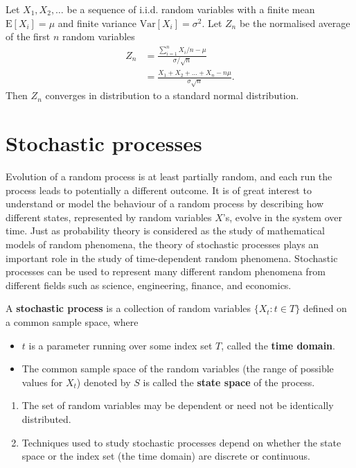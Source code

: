 \documentclass[
]{book}
\theoremstyle{definition}
\theoremstyle{definition}
\theoremstyle{definition}
\theoremstyle{definition}
\theoremstyle{remark}
\begin{document}
Let \(X_1, X_2, \ldots\) be a sequence of i.i.d. random variables with a
finite mean \(\mathrm{E}[X_i] = \mu\) and finite variance
\(\mathrm{Var}[X_i] = \sigma^2\). Let \(Z_n\) be the normalised average of
the first \(n\) random variables \[\begin{aligned}
        Z_n &= \frac{\sum_{i=1}^n X_i/n  - \mu}{\sigma/\sqrt{n}} \\
               &= \frac{X_1 + X_2 + \ldots + X_n  - n\mu}{\sigma \sqrt{n}}.
    \end{aligned}\] Then \(Z_n\) converges in distribution to a standard
normal distribution.

\hypertarget{stochastic-processes}{%
\chapter{Stochastic processes}\label{stochastic-processes}}

Evolution of a random process is at least partially random, and each run
the process leads to potentially a different outcome. It is of great
interest to understand or model the behaviour of a random process by
describing how different states, represented by random variables \(X\)'s,
evolve in the system over time. Just as probability theory is considered
as the study of mathematical models of random phenomena, the theory of
stochastic processes plays an important role in the study of
time-dependent random phenomena. Stochastic processes can be used to
represent many different random phenomena from different fields such as
science, engineering, finance, and economics.

A \textbf{stochastic process} is a collection of random variables
\(\{ X_t : t \in T\}\) defined on a common sample space, where

\begin{itemize}
\item
  \(t\) is a parameter running over some index set \(T\), called the
  \textbf{time domain}.
\item
  The common sample space of the random variables (the range of
  possible values for \(X_t\)) denoted by \(S\) is called the \textbf{state
  space} of the process.
\end{itemize}

\begin{enumerate}
\def\labelenumi{\arabic{enumi}.}
\item
  The set of random variables may be dependent or need not be
  identically distributed.
\item
  Techniques used to study stochastic processes depend on whether the
  state space or the index set (the time domain) are discrete or
  continuous.
\end{enumerate}
\end{document}
